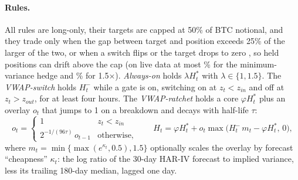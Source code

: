 \documentclass[10pt,a4paper]{article}
\begin{document}
\paragraph{Rules.} All rules are long-only, their targets are capped at 50\% of BTC notional, and they trade only when the gap between target and position exceeds 25\% of the larger of the two, or when a switch flips or the target drops to zero \citep{whalley1997asymptotic}, so held positions can drift above the cap (on live data at most \LiveMaxNotional\% for the minimum-variance hedge and \LiveMaxNotionalHalf\% for 1.5$\times$). \emph{Always-on} holds $\lambda H^\ast_t$ with $\lambda\in\{1,1.5\}$. The \emph{VWAP-switch} holds $H^-_t$ while a gate is on, switching on at $z_t<z_{in}$ and off at $z_t>z_{out}$, for at least four hours. The \emph{VWAP-ratchet} holds a core $\varphi H^\ast_t$ plus an overlay $o_t$ that jumps to 1 on a breakdown and decays with half-life $\tau$:
\begin{equation}\label{eq:ratchet}
o_t=\begin{cases}1 & z_t<z_{in}\\ 2^{-1/(96\tau)}\,o_{t-1} & \text{otherwise,}\end{cases}\qquad
H_t=\varphi H_t^\ast+o_t\max\!\big(H^-_t\,m_t-\varphi H_t^\ast,\,0\big),
\end{equation}
where $m_t=\min\{\max(e^{\kappa_t},0.5),1.5\}$ optionally scales the overlay by forecast ``cheapness'' $\kappa_t$: the log ratio of the 30-day HAR-IV forecast to implied variance, less its trailing 180-day median, lagged one day.
\end{document}
